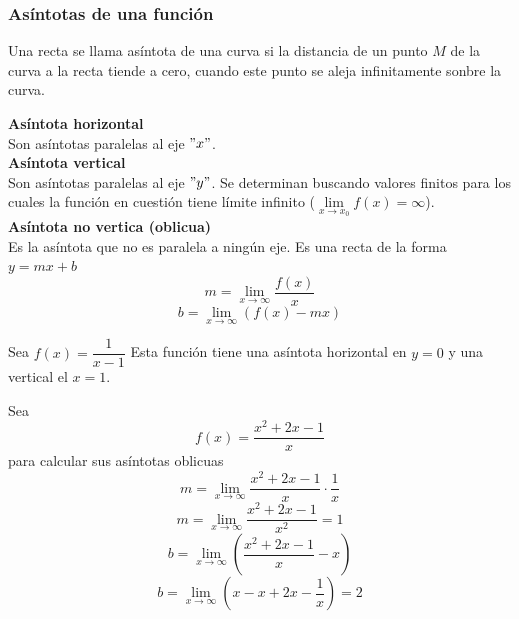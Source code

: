 \documentclass[10pt,twoside]{SelfArx} %
\begin{document}
\subsubsection{As\'intotas de una funci\'on}
\begin{thm}
	Una recta se llama \textsf{asíntota de una curva} si la distancia de un punto $ M $ de la curva a la recta tiende a cero, cuando este punto se aleja infinitamente sonbre la curva.
\end{thm}

\textbf{Asíntota horizontal}\\
Son asíntotas paralelas al eje $ "x" $.\\


\textbf{Asíntota vertical}\\
Son asíntotas paralelas al eje $ "y" $. Se determinan buscando valores finitos para los cuales la función en cuestión tiene límite infinito ($ \lim\limits_{x\rightarrow x_{0}}f(x)=\infty $).\\

\textbf{Asíntota no vertica (oblicua)}\\
Es la asíntota que no es paralela a ningún eje. Es una recta de la forma $ y=mx+b $\\
\[ m=\lim\limits_{x\rightarrow\infty}\dfrac{f(x)}{x} \]
\[ b=\lim\limits_{x\rightarrow\infty}(f(x)-mx) \]

\begin{ejemplo}
	Sea $ f(x)=\dfrac{1}{x-1} $
	Esta función tiene una asíntota horizontal en $ y=0 $ y una vertical el $ x=1 $.
\end{ejemplo}

\begin{ejemplo}
	Sea
	\[ f(x)=\dfrac{x^{2}+2x-1}{x} \]
	para calcular sus as\'intotas oblicuas
	\begin{equation}
	m=\lim\limits_{x\rightarrow\infty}\dfrac{x^{2}+2x-1}{x}\cdot\dfrac{1}{x}
	\end{equation}
	\begin{equation}
		m=\lim\limits_{x\rightarrow\infty}\dfrac{x^{2}+2x-1}{x^{2}}=1
	\end{equation}
	\begin{equation}
		b=\lim\limits_{x\rightarrow\infty}\left (\dfrac{x^{2}+2x-1}{x}-x\right )
	\end{equation}
	\begin{equation}
	b=\lim\limits_{x\rightarrow\infty}(x-x+2x-\dfrac{1}{x})=2
	\end{equation}
\end{ejemplo}
\end{document}
